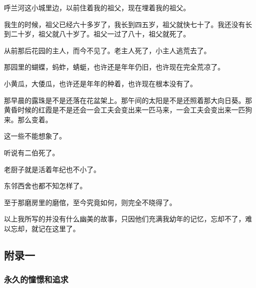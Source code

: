\par 呼兰河这小城里边，以前住着我的祖父，现在埋着我的祖父。
\par 我生的时候，祖父已经六十多岁了，我长到四五岁，祖父就快七十了。我还没有长到二十岁，祖父就八十岁了。祖父一过了八十，祖父就死了。
\par 从前那后花园的主人，而今不见了。老主人死了，小主人逃荒去了。
\par 那园里的蝴蝶，蚂蚱，蜻蜓，也许还是年年仍旧，也许现在完全荒凉了。
\par 小黄瓜，大倭瓜，也许还是年年的种着，也许现在根本没有了。
\par 那早晨的露珠是不是还落在花盆架上。那午间的太阳是不是还照着那大向日葵。那黄昏时候的红霞是不是还会一会工夫会变出来一匹马来，一会工夫会变出来一匹狗来。那么变着。
\par 这一些不能想象了。
\par 听说有二伯死了。
\par 老厨子就是活着年纪也不小了。
\par 东邻西舍也都不知怎样了。
\par 至于那磨房里的磨倌，至今究竟如何，则完全不晓得了。
\par 以上我所写的并没有什么幽美的故事，只因他们充满我幼年的记忆，忘却不了，难以忘却，就记在这里了。
\par {}


\subsection{附录一}

\subsubsection{永久的憧憬和追求}

